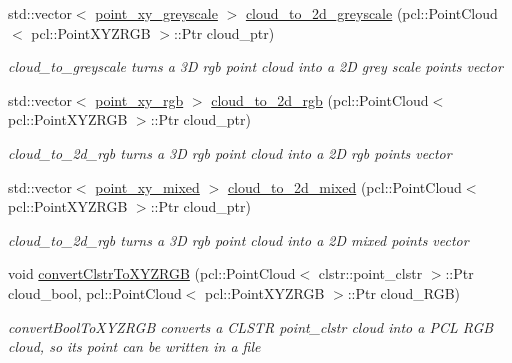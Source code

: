 \begin{DoxyCompactItemize}
\item 
std\+::vector$<$ \hyperlink{classcloud__object__segmentation_1_1point__xy__greyscale}{point\+\_\+xy\+\_\+greyscale} $>$ \hyperlink{namespacecloud__object__segmentation_1_1cloud__manip_a2ee6a68a81f4c6bc497e4d7990e38283}{cloud\+\_\+to\+\_\+2d\+\_\+greyscale} (pcl\+::\+Point\+Cloud$<$ pcl\+::\+Point\+X\+Y\+Z\+R\+GB $>$\+::Ptr cloud\+\_\+ptr)
\begin{DoxyCompactList}\small\item\em cloud\+\_\+to\+\_\+greyscale turns a 3D rgb point cloud into a 2D grey scale points vector \end{DoxyCompactList}\item 
std\+::vector$<$ \hyperlink{classcloud__object__segmentation_1_1point__xy__rgb}{point\+\_\+xy\+\_\+rgb} $>$ \hyperlink{namespacecloud__object__segmentation_1_1cloud__manip_a84dd5c3918c97a7839d063fd61ae2141}{cloud\+\_\+to\+\_\+2d\+\_\+rgb} (pcl\+::\+Point\+Cloud$<$ pcl\+::\+Point\+X\+Y\+Z\+R\+GB $>$\+::Ptr cloud\+\_\+ptr)
\begin{DoxyCompactList}\small\item\em cloud\+\_\+to\+\_\+2d\+\_\+rgb turns a 3D rgb point cloud into a 2D rgb points vector \end{DoxyCompactList}\item 
std\+::vector$<$ \hyperlink{classcloud__object__segmentation_1_1point__xy__mixed}{point\+\_\+xy\+\_\+mixed} $>$ \hyperlink{namespacecloud__object__segmentation_1_1cloud__manip_a0c4604ff071a727fc9c80b6b51c95c40}{cloud\+\_\+to\+\_\+2d\+\_\+mixed} (pcl\+::\+Point\+Cloud$<$ pcl\+::\+Point\+X\+Y\+Z\+R\+GB $>$\+::Ptr cloud\+\_\+ptr)
\begin{DoxyCompactList}\small\item\em cloud\+\_\+to\+\_\+2d\+\_\+rgb turns a 3D rgb point cloud into a 2D mixed points vector \end{DoxyCompactList}\item 
void \hyperlink{namespacecloud__object__segmentation_1_1cloud__manip_a3cb183f8366ffa244a7ce929f3335c49}{convert\+Clstr\+To\+X\+Y\+Z\+R\+GB} (pcl\+::\+Point\+Cloud$<$ clstr\+::point\+\_\+clstr $>$\+::Ptr cloud\+\_\+bool, pcl\+::\+Point\+Cloud$<$ pcl\+::\+Point\+X\+Y\+Z\+R\+GB $>$\+::Ptr cloud\+\_\+\+R\+GB)
\begin{DoxyCompactList}\small\item\em convert\+Bool\+To\+X\+Y\+Z\+R\+GB converts a C\+L\+S\+TR point\+\_\+clstr cloud into a P\+CL R\+GB cloud, so its point can be written in a file \end{DoxyCompactList}\item 

\end{DoxyCompactItemize}
